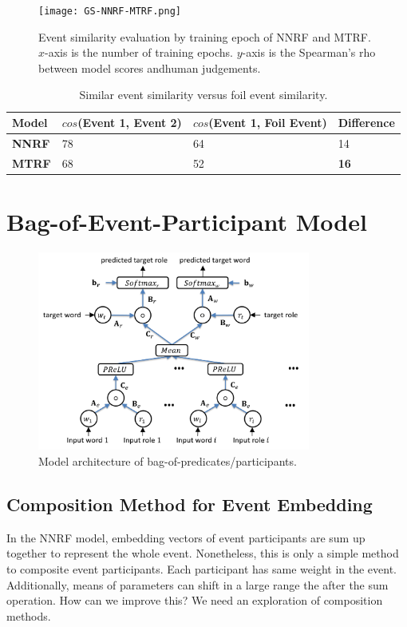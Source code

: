 \documentclass[a4paper]{article}
\begin{document}
\begin{figure}[t]
\centering
\texttt{[image: GS-NNRF-MTRF.png]}
\caption{\label{fig:GS-NNRF-MTRF} Event similarity evaluation by training epoch of NNRF and MTRF. $x$-axis is the number of training epochs. $y$-axis is the Spearman's rho between model scores andhuman judgements. }
\end{figure}


\begin{table}[t]
\centering
\begin{tabular}{l|lll}
    \textbf{Model}  &   $cos$(Event 1, Event 2)   &    $cos$(Event 1, Foil Event)    &  Difference  \\ \hline
    \textbf{NNRF}   &   78  &   64  &   14  \\
    \textbf{MTRF}   &   68  &   52  &   \textbf{16}  \\
\end{tabular}
\caption{\label{tab:foil-mtrf} Similar event similarity versus foil event similarity. }
\end{table}



\newpage
\section{Bag-of-Event-Participant Model} \label{sec:bop}


\begin{figure}[t]
\centering
\includegraphics[width=0.8\textwidth]{BOP.png}
\caption{\label{fig:BOP} Model architecture of bag-of-predicates/participants.}
\end{figure}


\subsection{Composition Method for Event Embedding} \label{sec:composition}
In the NNRF model, embedding vectors of event participants are sum up together to represent the whole event. Nonetheless, this is only a simple method to composite event participants. Each participant has same weight in the event. Additionally, means of parameters can shift in a large range the after the sum operation. How can we improve this? We need an exploration of composition methods. 
\end{document}
